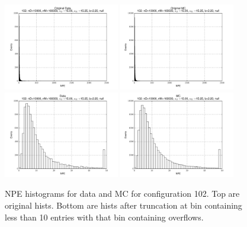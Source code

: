  \begin{figure}[htbp] \begin{center} 
\includegraphics[width=0.45\textwidth]{../FIGURES/102/FIG_Original_Data.pdf} 
\includegraphics[width=0.45\textwidth]{../FIGURES/102/FIG_Original_MC.pdf} 
\includegraphics[width=0.45\textwidth]{../FIGURES/102/FIG_Data.pdf} 
\includegraphics[width=0.45\textwidth]{../FIGURES/102/FIG_MC.pdf} 
\caption{NPE histograms for data and MC for configuration 102. Top are original hists. Bottom are hists after truncation at bin containing less than 10 entries with that bin containing overflows.} 
\label{tab:npe_102} 
\end{center} \end{figure} 
\clearpage
 